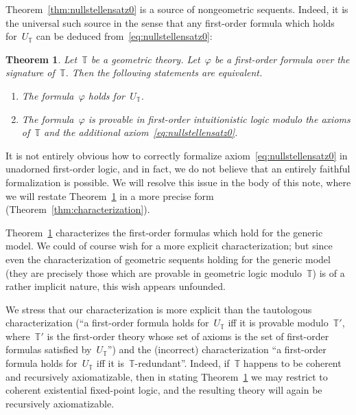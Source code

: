 \documentclass[oneside,reqno]{amsart}
\theoremstyle{definition}
\theoremstyle{plain}
\newtheorem{thm}[defn]{Theorem}
\theoremstyle{remark}
\newcommand{\TT}{\mathbb{T}}
\renewcommand{\_}{\mathpunct{.}\,}
\newcommand{\?}{\,{:}\,}
\begin{document}
Theorem~\ref{thm:nullstellensatz0} is a source of nongeometric sequents. Indeed,
it is the universal such source in the sense that any first-order formula
which holds for~$U_\TT$ can be deduced from~\eqref{eq:nullstellensatz0}:

\begin{thm}\label{thm:characterization0}
Let~$\TT$ be a geometric theory. Let~$\varphi$ be a first-order
formula over the signature of~$\TT$. Then the following statements are
equivalent.
\begin{enumerate}
\item The formula~$\varphi$ holds for~$U_\TT$. \smallskip
\item The formula~$\varphi$ is provable in first-order intuitionistic logic
modulo the axioms of~$\TT$ and the additional axiom~\eqref{eq:nullstellensatz0}.
\end{enumerate}
\end{thm}

It is not entirely obvious how to correctly formalize
axiom~\eqref{eq:nullstellensatz0} in unadorned first-order logic, and in
fact, we do not believe that an entirely faithful formalization is possible.
We will resolve this issue in the body of this note, where we will restate
Theorem~\ref{thm:characterization0} in a more precise form (Theorem~\ref{thm:characterization}).

Theorem~\ref{thm:characterization0} characterizes the first-order formulas
which hold for the generic model. We could of course wish for a more explicit
characterization; but since even the characterization of geometric sequents
holding for the generic model (they are precisely those which are provable in
geometric logic modulo~$\TT$) is of a rather implicit nature, this wish appears
unfounded.

We stress that our characterization is more explicit than the tautologous
characterization (``a first-order formula holds for~$U_\TT$ iff it is provable
modulo~$\TT'$, where~$\TT'$ is the first-order theory whose set of axioms is the
set of first-order formulas satisfied by~$U_\TT$'') and the (incorrect)
characterization ``a first-order formula holds for~$U_\TT$ iff it
is~$\TT$-redundant''. Indeed, if~$\TT$ happens to be coherent and recursively
axiomatizable, then in stating Theorem~\ref{thm:characterization0} we may
restrict to coherent existential fixed-point logic, and the resulting theory
will again be recursively axiomatizable.
\medskip


\end{document}
